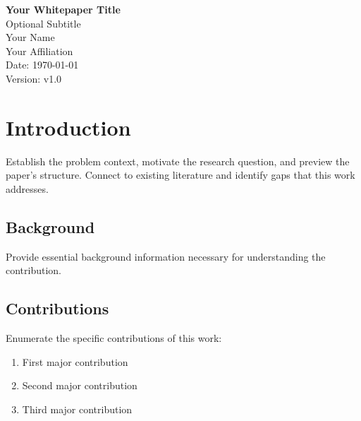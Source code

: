 \documentclass[11pt,letterpaper]{article}
\begin{document}
\begin{titlepage}
\centering

{\LARGE\bfseries Your Whitepaper Title}\\[0.5em]
{\Large Optional Subtitle}\\[2em]

{\large Your Name}\\
{\normalsize Your Affiliation}\\[1em]

{\normalsize Date: \today}\\
{\normalsize Version: v1.0}\\[2em]

\vfill

\begin{abstract}
Your abstract goes here. Summarize the key contributions, methodology, 
and findings in 150-250 words. This section should be self-contained 
and enable readers to determine paper relevance without reading further.
\end{abstract}

\end{titlepage}

\tableofcontents
\newpage


\section{Introduction}

Establish the problem context, motivate the research question, and preview 
the paper's structure. Connect to existing literature and identify gaps 
that this work addresses.

\subsection{Background}

Provide essential background information necessary for understanding the 
contribution.

\subsection{Contributions}

Enumerate the specific contributions of this work:

\begin{enumerate}
    \item First major contribution
    \item Second major contribution
    \item Third major contribution
\end{enumerate}
\end{document}
